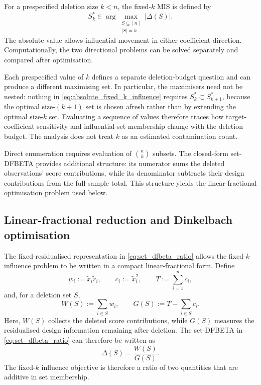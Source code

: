 \documentclass[../main.tex]{subfiles}
\begin{document}
For a prespecified deletion size \(k<n\), the fixed-\(k\) MIS is defined by
\begin{equation}
S_k^*
\in
\arg\max_{\substack{S\subseteq[n]\\|S|=k}}
|\Delta(S)|.
\label{eq:absolute_fixed_k_influence}
\end{equation}
The absolute value allows influential movement in either coefficient direction. Computationally, the two directional problems can be solved separately and compared after optimisation.

Each prespecified value of \(k\) defines a separate deletion-budget question and can produce a different maximising set. In particular, the maximisers need not be nested: nothing in \autoref{eq:absolute_fixed_k_influence} requires \(S_k^\ast\subset S_{k+1}^\ast\), because the optimal size-\((k+1)\) set is chosen afresh rather than by extending the optimal size-\(k\) set. Evaluating a sequence of values therefore traces how target-coefficient sensitivity and influential-set membership change with the deletion budget. The analysis does not treat \(k\) as an estimated contamination count.

Direct enumeration requires evaluation of \(\binom{n}{k}\) subsets. The closed-form set-DFBETA provides additional structure: its numerator sums the deleted observations' score contributions, while its denominator subtracts their design contributions from the full-sample total. This structure yields the linear-fractional optimisation problem used below.

\subsection{Linear-fractional reduction and Dinkelbach optimisation}
\label{subsec:dinkelbach_optimisation}

The fixed-residualised representation in \autoref{eq:set_dfbeta_ratio} allows the fixed-$k$ influence problem to be written in a compact linear-fractional form. Define
\begin{equation}
w_i := \widetilde{x}_i\widetilde{r}_i,
\qquad
c_i := \widetilde{x}_i^2,
\qquad
T := \sum_{i=1}^{n} c_i,
\label{eq:linear_fractional_components}
\end{equation}
and, for a deletion set $S$,
\begin{equation}
W(S) := \sum_{i\in S} w_i,
\qquad
G(S) := T-\sum_{i\in S} c_i.
\label{eq:WG_definitions}
\end{equation}
Here, $W(S)$ collects the deleted score contributions, while $G(S)$ measures the residualised design information remaining after deletion. The set-DFBETA in \autoref{eq:set_dfbeta_ratio} can therefore be written as
\begin{equation}
\Delta(S)
=
\frac{W(S)}{G(S)}.
\label{eq:linear_fractional_objective}
\end{equation}
The fixed-$k$ influence objective is therefore a ratio of two quantities that are additive in set membership.
\end{document}
